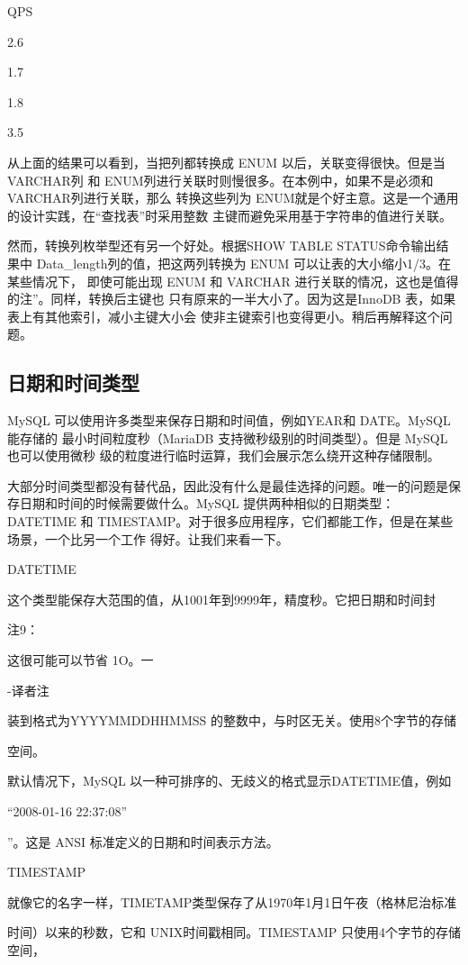 QPS

2.6

1.7

1.8

3.5

从上面的结果可以看到，当把列都转换成 ENUM 以后，关联变得很快。但是当 VARCHAR列
和 ENUM列进行关联时则慢很多。在本例中，如果不是必须和 VARCHAR列进行关联，那么
转换这些列为 ENUM就是个好主意。这是一个通用的设计实践，在“查找表”时采用整数
主键而避免采用基于字符串的值进行关联。

然而，转换列枚举型还有另一个好处。根据SHOW TABLE STATUS命令输出结果中
Data\_length列的值，把这两列转换为 ENUM 可以让表的大小缩小1/3。在某些情况下，
即使可能出现 ENUM 和 VARCHAR 进行关联的情况，这也是值得的注”。同样，转换后主键也
只有原来的一半大小了。因为这是InnoDB 表，如果表上有其他索引，减小主键大小会
使非主键索引也变得更小。稍后再解释这个问题。

\subsection{日期和时间类型}
MySQL 可以使用许多类型来保存日期和时间值，例如YEAR和 DATE。MySQL 能存储的
最小时间粒度秒（MariaDB 支持微秒级别的时间类型）。但是 MySQL 也可以使用微秒
级的粒度进行临时运算，我们会展示怎么绕开这种存储限制。

大部分时间类型都没有替代品，因此没有什么是最佳选择的问题。唯一的问题是保
存日期和时间的时候需要做什么。MySQL 提供两种相似的日期类型：DATETIME 和
TIMESTAMP。对于很多应用程序，它们都能工作，但是在某些场景，一个比另一个工作
得好。让我们来看一下。

DATETIME

这个类型能保存大范围的值，从1001年到9999年，精度秒。它把日期和时间封

注9：

这很可能可以节省 1O。一

-译者注

装到格式为YYYYMMDDHHMMSS 的整数中，与时区无关。使用8个字节的存储

空间。

默认情况下，MySQL 以一种可排序的、无歧义的格式显示DATETIME值，例如

“2008-01-16 22:37:08”

”。这是 ANSI 标准定义的日期和时间表示方法。

TIMESTAMP

就像它的名字一样，TIMETAMP类型保存了从1970年1月1日午夜（格林尼治标准

时间）以来的秒数，它和 UNIX时间戳相同。TIMESTAMP 只使用4个字节的存储空间，

